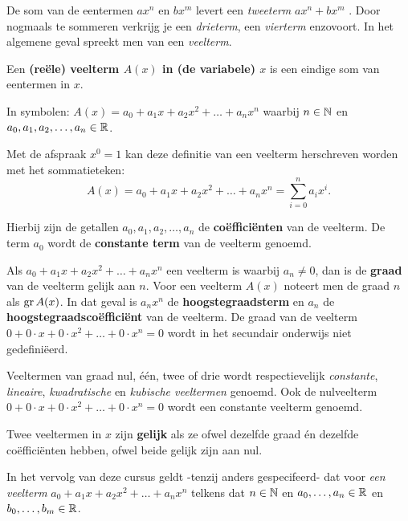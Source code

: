 \documentclass{ximera}
\begin{document}
\author{Koen de Naeghel - Wiskunde Op Maat}
    \xmsource



De som van de eentermen  $ax^n$ en $bx^m$ levert een \textit{tweeterm} $ax^n + bx^m$ . Door nogmaals te sommeren verkrijg je een \textit{drieterm}, een \textit{vierterm} enzovoort. In het algemene geval spreekt men van een \textit{veelterm}.

\begin{definition} 
Een \textbf{(reële) veelterm \(A(x)\) in (de variabele) $x$} is een eindige som van eentermen in $x$.

In symbolen: $A(x) = a_0 + a_1x + a_2x^2 + \dots + a_n x^n$ waarbij $n \in \mathbb{N}$ en $a_0,a_1,a_2,\ldots,a_n \in \mathbb{R}$.


Met de afspraak $x^0 = 1$ kan deze definitie van een veelterm herschreven worden met het sommatieteken:
\[
A(x) = a_0 + a_1x + a_2x^2 + \dots + a_n x^n = \sum_{i=0}^n a_i x^i.
\]

Hierbij zijn de getallen $a_0, a_1, a_2, \ldots, a_n$ de \textbf{coëfficiënten} van de veelterm. De term $a_0$ wordt de \textbf{constante term} van de veelterm genoemd.


Als $a_0 + a_1x + a_2x^2 + \dots + a_n x^n$ een veelterm is waarbij $a_n \neq 0$, dan is de \textbf{graad} van de veelterm gelijk aan $n$. Voor een veelterm $A(x)$ noteert men de graad \(n\) als $\operatorname{gr} A(x)$. In dat geval is $a_nx^n$ de \textbf{hoogstegraadsterm} en $a_n$ de \textbf{hoogstegraadscoëfficiënt} van de veelterm. De graad van de veelterm $0 + 0\cdot x + 0 \cdot x^2 + \dots + 0\cdot x^n = 0$ wordt in het secundair onderwijs niet gedefiniëerd.

Veeltermen van graad nul, één, twee of drie wordt respectievelijk \textit{constante}, \textit{lineaire}, \linebreak \textit{kwadratische} en \textit{kubische veeltermen} genoemd. Ook de nulveelterm $0 + 0\cdot x + 0 \cdot x^2 + \dots + 0\cdot x^n = 0$ wordt een constante veelterm genoemd.


Twee veeltermen in $x$ zijn \textbf{gelijk} als ze ofwel dezelfde graad én dezelfde coëfficiënten hebben, ofwel beide gelijk zijn aan nul. 


\end{definition}




\begin{notation}
    
    In het vervolg van deze cursus geldt -tenzij anders gespecifeerd- dat voor \textit{ een veelterm} $a_0 + a_1x + a_2x^2 + \dots + a_n x^n$ telkens dat $n \in \mathbb{N}$ en $a_0, \ldots, a_n\in \mathbb{R}$ en $b_0, \ldots, b_m\in \mathbb{R}$.
    
\end{notation}
\end{document}
